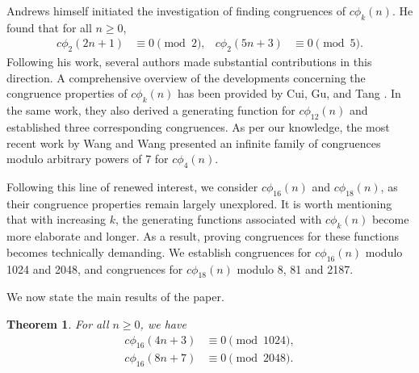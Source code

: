 \documentclass[12pt]{article}
\numberwithin{equation}{section}
\theoremstyle{plain}
\newtheorem{theorem}{Theorem}
\numberwithin{theorem}{section}
\theoremstyle{definition}
\theoremstyle{remark}
\begin{document}
     Andrews himself \cite{And84} initiated the investigation of finding congruences of $c\phi_k(n)$. He found that for all $n\ge0$,
     \begin{align*}
         c\phi_2(2n+1)&\equiv 0 \pmod{2}, & c\phi_2(5n+3)&\equiv 0 \pmod{5}.
     \end{align*}
     Following his work, several authors made substantial contributions in this direction. A comprehensive overview of the developments concerning the congruence properties of $c\phi_k(n)$ has been provided by Cui, Gu, and Tang \cite[p. 779]{CGT24b}. In the same work, they also derived a generating function for $c\phi_{12}(n)$ and established three corresponding congruences. As per our knowledge, the most recent work by Wang and Wang \cite{WW25} presented an infinite family of congruences modulo arbitrary powers of 7 for $c\phi_4(n)$. %

     Following this line of renewed interest, we consider $c\phi_{16}(n)$ and $c\phi_{18}(n)$, as their congruence properties remain largely unexplored. It is worth mentioning that with increasing $k$, the generating functions associated with $c\phi_k(n)$ become more elaborate and longer. As a result, proving congruences for these functions becomes technically demanding. We establish congruences for $c\phi_{16}(n)$ modulo 1024 and 2048, and congruences for $c\phi_{18}(n)$ modulo 8, 81 and 2187. %
     
     We now state the main results of the paper.
	\begin{theorem}\label{th:1.1}
		For all $n\ge0$, we have
		\begin{align}
			c\phi_{16}\left(4n+3\right)&\equiv 0\pmod{1024},\label{eq:c_phi_1024}\\
			c\phi_{16}\left(8n+7\right)&\equiv 0\pmod{2048}.\label{eq:c_phi_2048}
		\end{align}   
	\end{theorem}
	
\end{document}
